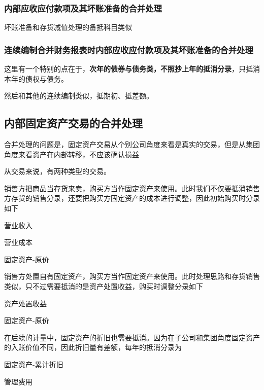 \documentclass[UTF8,12pt]{ctexart}
\newenvironment{Dr}{%
	\begin{list}{}%
		{
			\setlength{\leftmargin}{2em}
			\setlength{\labelwidth}{2em}
			\setlength{\labelsep}{0pt}
			\setlength{\itemindent}{0pt}
			\setlength{\listparindent}{0pt}
			\setlength{\parsep}{0pt}
			\setlength{\topsep}{0pt}
		}
		\item[\textbf{借：}]
	}{%
	\end{list}
}
\newenvironment{Cr}{%
	\begin{list}{}%
		{
			\setlength{\leftmargin}{3em}
			\setlength{\labelwidth}{2em}
			\setlength{\labelsep}{0pt}
			\setlength{\itemindent}{0pt}
			\setlength{\listparindent}{0pt}
			\setlength{\parsep}{0pt}
			\setlength{\topsep}{0pt}
		}
		\item[\textbf{贷：}]
	}{%
	\end{list}
}
\numberwithin{equation}{section} %
\numberwithin{figure}{section}
\numberwithin{table}{section}
\begin{document}
	\subsubsection{内部应收应付款项及其坏账准备的合并处理}
	坏账准备和存货减值处理的备抵科目类似
	
	\subsubsection{连续编制合并财务报表时内部应收应付款项及其坏账准备的合并处理}
	这里有一个特别的点在于，\textbf{次年的债券与债务类，不照抄上年的抵消分录}，只抵消本年的债权与债务。
	
	然后和其他的连续编制类似，抵期初、抵差额。
	
	\subsection{内部固定资产交易的合并处理}
	合并处理的问题是，固定资产交易从个别公司角度来看是真实的交易，但是从集团角度来看资产在内部转移，不应该确认损益
	
	从交易来说，有两种类型的交易。
	\begin{enumerate}
		\item 销售方把商品当存货来卖，购买方当作固定资产来使用。此时我们不仅要抵消销售方存货的销售分录，还要把购买方固定资产的成本进行调整，因此初始购买时分录如下
		
		\begin{Dr}
			营业收入
		\end{Dr}
		\begin{Cr}
			营业成本
			
			固定资产-原价
		\end{Cr}
		
		\item 销售方处置自有固定资产，购买方当作固定资产来使用。此时处理思路和存货销售类似，只不过需要抵消的是资产处置收益，购买时调整分录如下
		
		\begin{Dr}
			资产处置收益
		\end{Dr}
		\begin{Cr}
			固定资产-原价
		\end{Cr}
	\end{enumerate}
	
	在后续的计量中，固定资产的折旧也需要抵消。因为在子公司和集团角度固定资产的入账价值不同，因此折旧量有差额，每年的抵消分录为
	\begin{Dr}
		固定资产-累计折旧
	\end{Dr}
	\begin{Cr}
		管理费用
	\end{Cr}
	
\end{document}
